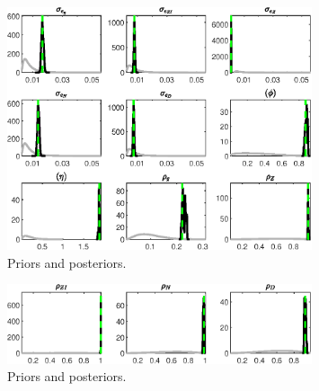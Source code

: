  
\begin{figure}[H]
\centering
\includegraphics[width=0.80\textwidth]{BRS_util/Output/BRS_util_PriorsAndPosteriors1}
\caption{Priors and posteriors.}\label{Fig:PriorsAndPosteriors:1}
\end{figure}
 
\begin{figure}[H]
\centering
\includegraphics[width=0.80\textwidth]{BRS_util/Output/BRS_util_PriorsAndPosteriors2}
\caption{Priors and posteriors.}\label{Fig:PriorsAndPosteriors:2}
\end{figure}
 
